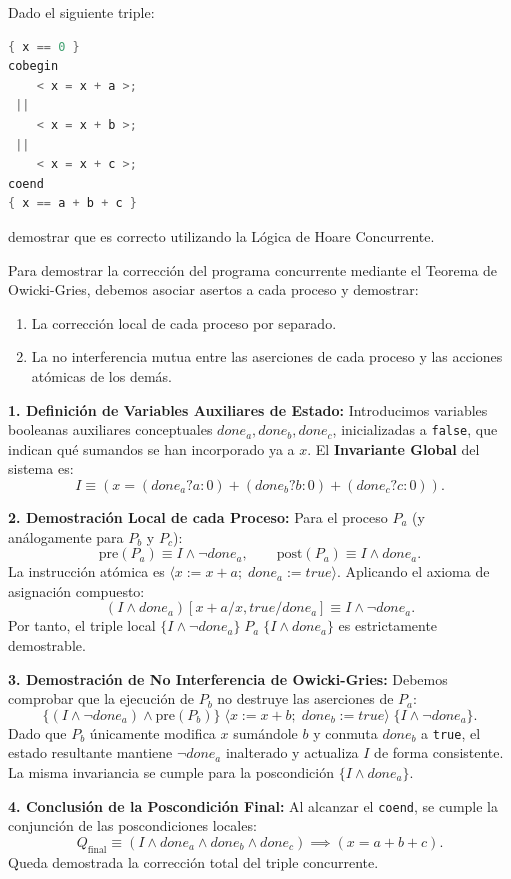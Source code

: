\begin{ejercicio}
Dado el siguiente triple:
\begin{lstlisting}[language=C++]
{ x == 0 }
cobegin
    < x = x + a >;
 ||
    < x = x + b >;
 ||
    < x = x + c >;
coend
{ x == a + b + c }
\end{lstlisting}
demostrar que es correcto utilizando la Lógica de Hoare Concurrente.
\end{ejercicio}

\begin{solucion}
Para demostrar la corrección del programa concurrente mediante el Teorema de Owicki-Gries, debemos asociar asertos a cada proceso y demostrar:
\begin{enumerate}
    \item La corrección local de cada proceso por separado.
    \item La no interferencia mutua entre las aserciones de cada proceso y las acciones atómicas de los demás.
\end{enumerate}

\textbf{1. Definición de Variables Auxiliares de Estado:}
Introducimos variables booleanas auxiliares conceptuales $done_a, done_b, done_c$, inicializadas a \texttt{false}, que indican qué sumandos se han incorporado ya a $x$.
El \textbf{Invariante Global} del sistema es:
\[
I \equiv \left( x = (done_a ? a : 0) + (done_b ? b : 0) + (done_c ? c : 0) \right).
\]

\textbf{2. Demostración Local de cada Proceso:}
Para el proceso $P_a$ (y análogamente para $P_b$ y $P_c$):
\[
\text{pre}(P_a) \equiv I \land \neg done_a, \qquad \text{post}(P_a) \equiv I \land done_a.
\]
La instrucción atómica es $\langle x := x + a; \; done_a := true \rangle$.
Aplicando el axioma de asignación compuesto:
\[
(I \land done_a)[x + a / x, true / done_a] \equiv I \land \neg done_a.
\]
Por tanto, el triple local $\{I \land \neg done_a\} \; P_a \; \{I \land done_a\}$ es estrictamente demostrable.

\textbf{3. Demostración de No Interferencia de Owicki-Gries:}
Debemos comprobar que la ejecución de $P_b$ no destruye las aserciones de $P_a$:
\[
\{(I \land \neg done_a) \land \text{pre}(P_b)\} \; \langle x := x + b; \; done_b := true \rangle \; \{I \land \neg done_a\}.
\]
Dado que $P_b$ únicamente modifica $x$ sumándole $b$ y conmuta $done_b$ a \texttt{true}, el estado resultante mantiene $\neg done_a$ inalterado y actualiza $I$ de forma consistente. La misma invariancia se cumple para la poscondición $\{I \land done_a\}$.

\textbf{4. Conclusión de la Poscondición Final:}
Al alcanzar el \texttt{coend}, se cumple la conjunción de las poscondiciones locales:
\[
Q_{\text{final}} \equiv (I \land done_a \land done_b \land done_c) \implies (x = a + b + c).
\]
Queda demostrada la corrección total del triple concurrente.
\end{solucion}

